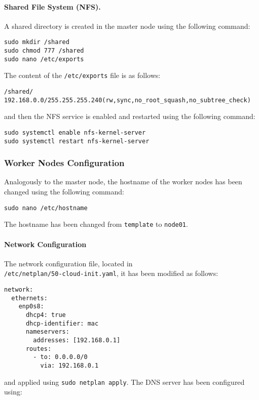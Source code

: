 \paragraph{Shared File System (NFS).}

A shared directory is created in the master node using the following command:

\begin{verbatim}
sudo mkdir /shared
sudo chmod 777 /shared
sudo nano /etc/exports
\end{verbatim}
The content of the \texttt{/etc/exports} file is as follows:

\begin{verbatim}
/shared/ 192.168.0.0/255.255.255.240(rw,sync,no_root_squash,no_subtree_check)
\end{verbatim}
and then the NFS service is enabled and restarted using the following command:

\begin{verbatim}
sudo systemctl enable nfs-kernel-server
sudo systemctl restart nfs-kernel-server
\end{verbatim}

\subsubsection{Worker Nodes Configuration}

Analogously to the master node, the hostname of the worker nodes has been changed using the following command:

\begin{verbatim}
sudo nano /etc/hostname
\end{verbatim}
The hostname has been changed from \texttt{template} to \texttt{node01}. 

\paragraph{Network Configuration}

The network configuration file, located in \\\texttt{/etc/netplan/50-cloud-init.yaml}, it has been modified as follows:
\begin{verbatim}
network:
  ethernets:
    enp0s8:
      dhcp4: true
      dhcp-identifier: mac
      nameservers:
        addresses: [192.168.0.1]
      routes:
        - to: 0.0.0.0/0
          via: 192.168.0.1
\end{verbatim}
and applied using \texttt{sudo netplan apply}.
The DNS server has been configured using:

